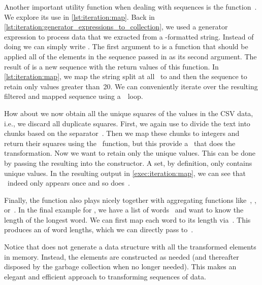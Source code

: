 %
%
Another important utility function when dealing with sequences is the function~.
We explore its use in \cref{lst:iteration:map}.
Back in \cref{lst:iteration:generator_expressions_to_collection}, we used a generator expression to process data that we exracted from a -formatted string.
Instead of doing  we can simply write .
The first argument to  is a function that should be applied all of the elements in the sequence passed in as its second argument.
The result of  is a new sequence with the return values of this function.
In \cref{lst:iteration:map}, we map the string  split at all~ to  and then  the sequence to retain only values greater than~20.
We can conveniently iterate over the resulting filtered and mapped sequence using a~~loop.

How about we now obtain all the unique squares of the values in the CSV data, i.e., we discard all duplicate squares.
First, we again use  to divide the text into chunks based on the separator~.
Then we map these chunks to integers and return their squares using the ~function, but this provide a~ that does the transformation.
Now we want to retain only the unique values.
This can be done by passing the resulting  into the  constructor.
A set, by definition, only contains unique values.
In the resulting output in \cref{exec:iteration:map}, we can see that ~indeed only appears once and so does~.

Finally, the  function also plays nicely together with aggregating functions like~, , or~.
In the final example for , we have a list of words~ and want to know the length of the longest word.
We can first map each word to its length via~.
This produces an  of word lengths, which we can directly pass to~.

Notice that  does not generate a data structure with all the transformed elements in memory.
Instead, the elements are constructed as needed (and thereafter disposed by the garbage collection when no longer needed).
This makes  an elegant and efficient approach to transforming sequences of data.

